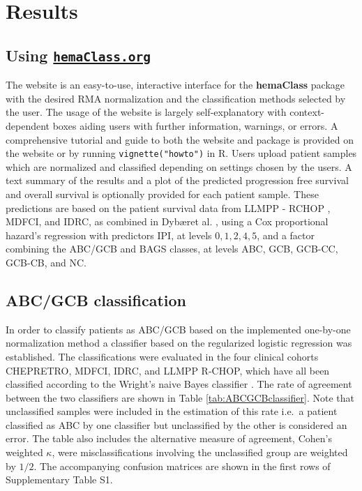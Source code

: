 \documentclass[twocolumn]{bmcart}%
\newcommand{\hemaClass}{\href{http://hemaClass.org}{\texttt{hemaClass.org}}}
\newcommand{\R}{\textsf{R}}
\newcommand{\pkg}[1]{\textbf{#1}}
\begin{document}
\section{Results}
\subsection{Using \hemaClass{}}
The website is an easy-to-use, interactive interface for the \pkg{hemaClass} package with the desired RMA normalization and the classification methods selected by the user.
The usage of the website is largely self-explanatory with context-dependent boxes aiding users with further information, warnings, or errors.
A comprehensive tutorial and guide to both the website and package is provided on the website or by running \texttt{vignette("howto")} in \R{}.
Users upload patient samples which are normalized and classified depending on settings chosen by the users.
A text summary of the results and a plot of the predicted progression free survival and overall survival is optionally provided for each patient sample.
These predictions are based on the patient survival data from LLMPP - RCHOP , MDFCI, and IDRC, as combined in Dyb{\ae}ret al. \cite{DybkaerBoegsted2015}, using a Cox proportional hazard's regression with predictors IPI, at levels $0,1,2,4,5$, and a factor combining the ABC/GCB and BAGS classes, at levels ABC, GCB, GCB-CC, GCB-CB, and NC.



\subsection{ABC/GCB classification}
In order to classify patients as ABC/GCB based on the implemented one-by-one normalization method a classifier based on the regularized logistic regression was established.
The classifications were evaluated in the four clinical cohorts CHEPRETRO, MDFCI, IDRC, and LLMPP R-CHOP, which have all been classified according to the Wright's naive Bayes classifier \cite{Wright2003,Lenz2008a}.
The rate of agreement between the two classifiers are shown in Table \ref{tab:ABCGCBclassifier}.
Note that unclassified samples were included in the estimation of this rate i.e.\ a patient classified as ABC by one classifier but unclassified by the other is considered an error.
The table also includes the alternative measure of agreement, Cohen's weighted $\kappa$, were misclassifications involving the unclassified group are weighted by $1/2$.
The accompanying confusion matrices are shown in the first rows of Supplementary Table S1.%
\end{document}
